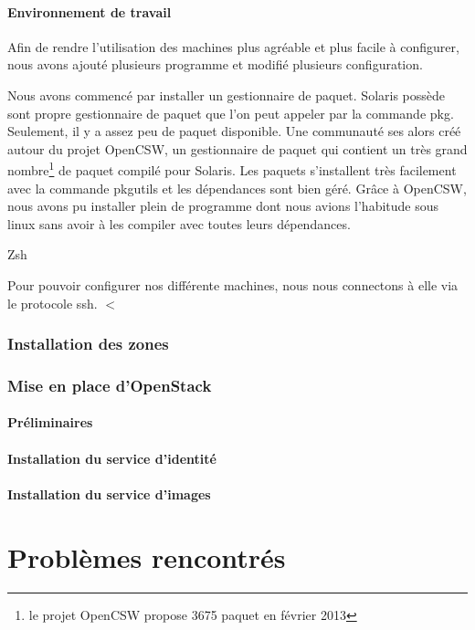 \documentclass{report}
\begin{document}
\subsubsection{Environnement de travail}
Afin de rendre l'utilisation des machines plus agréable et plus facile à configurer, nous avons ajouté plusieurs programme et modifié plusieurs configuration.

Nous avons commencé par installer un gestionnaire de paquet. Solaris possède sont propre gestionnaire de paquet que l'on peut appeler par la commande pkg. Seulement, il y a assez peu de paquet disponible. Une communauté ses alors créé autour du projet OpenCSW, un gestionnaire de paquet qui contient un très grand nombre\footnote{le projet OpenCSW propose 3675 paquet en février 2013} de paquet compilé pour Solaris. Les paquets s'installent très facilement avec la commande pkgutils et les dépendances sont bien géré. Grâce à OpenCSW, nous avons pu installer plein de programme dont nous avions l'habitude sous linux sans avoir à les compiler avec toutes leurs dépendances. 

Zsh

Pour pouvoir configurer nos différente machines, nous nous connectons à elle via le protocole ssh. $ < $

\subsection{Installation des zones}

\subsection{Mise en place d'OpenStack}
\subsubsection{Préliminaires}

\subsubsection{Installation du service d'identité}

\subsubsection{Installation du service d'images}

\chapter{Problèmes rencontrés}
\end{document}
